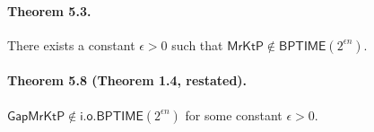 \paragraph{Theorem 5.3.}
There exists a constant $\epsilon>0$ such that $\mathsf{MrKtP}\notin\mathsf{BPTIME}(2^{\epsilon n})$.
\paragraph{Theorem 5.8 (Theorem 1.4, restated).}
$\mathsf{GapMrKtP}\notin\mathsf{i.o.BPTIME}(2^{\epsilon n})$ for some constant $\epsilon>0$.
